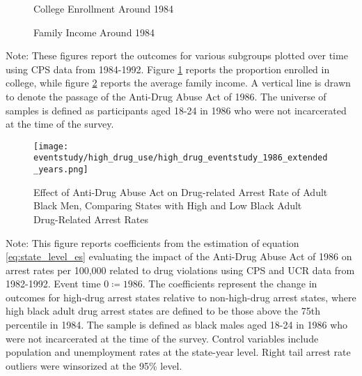 

\begin{figure}[h]
    \centering
    \caption{College Enrollment Around 1984}%
    \qquad
    \label{fig:raw_college_1986}%
  \end{figure}
  
  \begin{figure}[h]
    \centering
    \caption{Family Income Around 1984}%
    \qquad
    \label{fig:raw_faminc_1986}%
  \end{figure}
  
  \begin{footnotesize}
    \noindent Note: These figures report the outcomes for various subgroups plotted over time using CPS data from 1984-1992. Figure \ref{fig:raw_college_1986} reports the proportion enrolled in college, while figure \ref{fig:raw_faminc_1986} reports the average family income. A vertical line is drawn to denote the passage of the Anti-Drug Abuse Act of 1986. The universe of samples is defined as participants aged 18-24 in 1986 who were not incarcerated at the time of the survey.
  \end{footnotesize}
  
  \clearpage
  


  \clearpage

  \begin{figure}[h]
    \caption{Effect of Anti-Drug Abuse Act on Drug-related Arrest Rate of Adult Black Men, Comparing States with High and Low Black Adult Drug-Related Arrest Rates}
    \centering
    \texttt{[image: eventstudy/high\_drug\_use/high\_drug\_eventstudy\_1986\_extended\_years.png]}
    \label{fig:a3}
  \end{figure}
  \begin{footnotesize}
    \noindent Note: This figure reports coefficients from the estimation of equation \ref{eq:state_level_es} evaluating the impact of the Anti-Drug Abuse Act of 1986 on arrest rates per 100,000 related to drug violations using CPS and UCR data from 1982-1992. Event time $0 \coloneqq 1986$. The coefficients represent the change in outcomes for high-drug arrest states relative to non-high-drug arrest states, where high black adult drug arrest states are defined to be those above the 75th percentile in 1984. The sample is defined as black males aged 18-24 in 1986 who were not incarcerated at the time of the survey. Control variables include population and unemployment rates at the state-year level. Right tail arrest rate outliers were winsorized at the 95\% level.
  \end{footnotesize}

